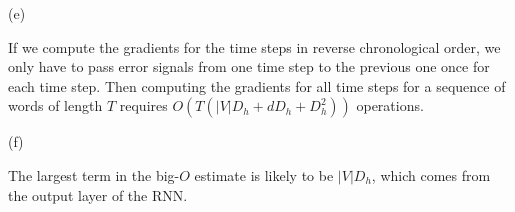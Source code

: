 \documentclass{article}
\begin{document}
(e)

If we compute the gradients for the time steps in reverse chronological order, we only have to pass error signals from one time step to the previous one once for each time step. Then computing the gradients for all time steps for a sequence of words of length $T$ requires $O(T(|V|D_h + dD_h + D_h^2))$ operations.

(f)

The largest term in the big-$O$ estimate is likely to be $|V|D_h$, which comes from the output layer of the RNN.
\end{document}
